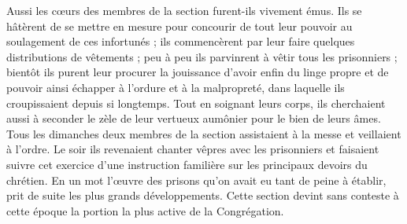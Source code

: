 Aussi les cœurs des membres de la section furent-ils vivement émus. Ils se hâtèrent de se mettre en mesure pour concourir de tout leur pouvoir au soulagement de ces infortunés ; ils commencèrent par leur faire quelques distributions de vêtements ; peu à peu ils parvinrent à vêtir tous les prisonniers ; bientôt ils purent
leur procurer la jouissance d'avoir enfin du linge propre et de pouvoir ainsi échapper à l'ordure et à la malpropreté, dans laquelle ils croupissaient depuis si longtemps. Tout en soignant leurs corps, ils cherchaient aussi à seconder le zèle de leur vertueux aumônier pour le bien de leurs âmes. Tous les dimanches deux membres de la section assistaient à la messe et veillaient à l'ordre. Le soir ils revenaient chanter vêpres avec les prisonniers et faisaient suivre cet exercice d'une instruction familière sur les principaux devoirs du chrétien. En un mot l'œuvre des prisons qu'on avait eu tant de peine à établir, prit de suite les plus grands développements. Cette section devint sans conteste à cette époque la portion la plus active de la Congrégation.

